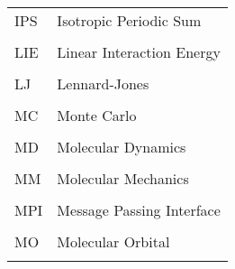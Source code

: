\begin{tabular}{lp{5in}}
IPS & Isotropic Periodic Sum \\ \\

LIE & Linear Interaction Energy \\ \\

LJ & Lennard-Jones \\ \\

MC & Monte Carlo \\ \\

MD & Molecular Dynamics \\ \\

MM & Molecular Mechanics \\ \\

MPI & Message Passing Interface \\ \\

MO & Molecular Orbital \\ \\

\end{tabular}
\newpage

